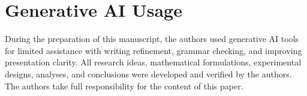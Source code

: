 \documentclass[sigconf,review]{acmart}
\begin{document}
\section*{Generative AI Usage}

During the preparation of this manuscript, the authors used generative AI tools for limited assistance with writing refinement, grammar checking, and improving presentation clarity. All research ideas, mathematical formulations, experimental designs, analyses, and conclusions were developed and verified by the authors. The authors take full responsibility for the content of this paper.






\clearpage


\end{document}
